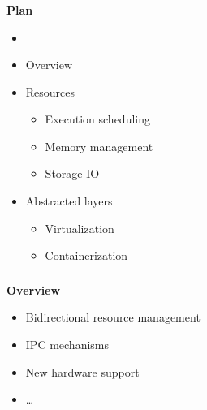 \documentclass[usenames,dvipsnames, 18pt, compress, aspectratio=169]{beamer}
\begin{document}
\begin{frame}
    \frametitle{}
    \begin{center}
    \textbf{Plan}

        \begin{itemize}
            \item <+->
        \end{itemize}

        \begin{itemize}[]
            \item<+-> Overview
            \item<+-> Resources
                \begin{itemize}[label={\MVRightarrow}]
                    \item Execution scheduling
                    \item Memory management
                    \item Storage IO
                \end{itemize}
            \item<+-> Abstracted layers
                \begin{itemize}[label={\MVRightarrow}]
                    \item Virtualization
                    \item Containerization
                \end{itemize}
        \end{itemize}

    \end{center}
\end{frame}

\begin{frame}
    \frametitle{}
    \begin{center}
    \textbf{Overview}

        \begin{itemize}[]
            \item Bidirectional resource management
            \item IPC mechanisms
            \item New hardware support
            \item \ldots
        \end{itemize}

    \end{center}
\end{frame}
\end{document}
